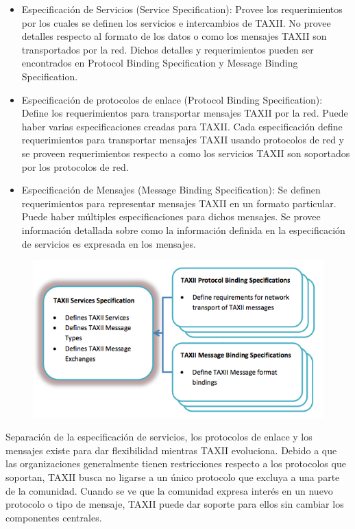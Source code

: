 \begin{itemize}
  
\item Especificación de Servicios (Service Specification): Provee los requerimientos por los cuales se definen los servicios e intercambios 
de TAXII. No provee detalles respecto al formato de los datos o como los 
mensajes TAXII son transportados por la red. Dichos detalles y requerimientos 
pueden ser encontrados en Protocol Binding Specification y Message Binding 
Specification.
\item Especificación de protocolos de enlace (Protocol Binding Specification): 
Define los requerimientos para transportar mensajes TAXII por la red. Puede 
haber varias especificaciones creadas para TAXII. Cada especificación define 
requerimientos para transportar mensajes TAXII usando protocolos de red y se 
proveen requerimientos respecto a como los servicios TAXII son soportados por 
los protocolos de red.
\item Especificación de Mensajes (Message Binding Specification): Se definen 
requerimientos para representar mensajes TAXII en un formato particular. Puede 
haber múltiples especificaciones para dichos mensajes. Se provee información 
detallada sobre como la información definida en la especificación de servicios 
es expresada en los mensajes.
\end{itemize}

\begin{figure}[ht!]
  \centering
    \includegraphics[width=150mm]{./Figures/TAXIIEspecification.png}
\end{figure}


Separación de la especificación de servicios, los protocolos de enlace y los 
mensajes existe para dar flexibilidad mientras TAXII evoluciona. Debido a que 
las organizaciones generalmente tienen restricciones respecto a los protocolos 
que soportan, TAXII busca no ligarse a un único protocolo que excluya a una 
parte de la comunidad. Cuando se ve que la comunidad expresa interés en un nuevo 
protocolo o tipo de mensaje, TAXII puede dar soporte para ellos sin cambiar los 
componentes centrales.

